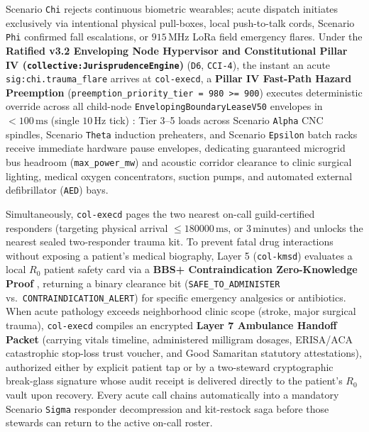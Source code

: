 Scenario \texttt{Chi} rejects continuous biometric wearables; acute dispatch initiates exclusively via intentional physical pull-boxes, local
push-to-talk cords, Scenario \texttt{Phi} confirmed fall escalations, or $915\,\mathrm{MHz}$ LoRa field emergency flares. Under the \textbf{Ratified
v3.2 Enveloping Node Hypervisor and Constitutional Pillar IV (\texttt{collective:JurisprudenceEngine})} (\texttt{D6}, \texttt{CCI-4}), the instant an
acute \texttt{sig:chi.trauma\_flare} arrives at \texttt{col-execd}, a \textbf{Pillar IV Fast-Path Hazard Preemption}
(\texttt{preemption\_priority\_tier = 980 >= 900}) executes deterministic override across all child-node \texttt{EnvelopingBoundaryLeaseV50} envelopes in
$< 100\,\mathrm{ms}$ (single $10\,\mathrm{Hz}$ tick) \parencite{liu1973scheduling}: Tier 3--5 loads across Scenario \texttt{Alpha} CNC spindles,
Scenario \texttt{Theta} induction preheaters, and Scenario \texttt{Epsilon} batch racks receive immediate hardware pause envelopes, dedicating guaranteed
microgrid bus headroom (\texttt{max\_power\_mw}) and acoustic corridor clearance to clinic surgical lighting, medical oxygen concentrators, suction
pumps, and automated external defibrillator (\texttt{AED}) bays.

Simultaneously, \texttt{col-execd} pages the two nearest on-call guild-certified responders (targeting physical arrival $\le 180000\,\mathrm{ms}$, or
$3\,\mathrm{minutes}$) and unlocks the nearest sealed two-responder trauma kit. To prevent fatal drug interactions without exposing a patient's medical
biography, Layer 5 (\texttt{col-kmsd}) evaluates a local $R_0$ patient safety card via a \textbf{BBS+ Contraindication Zero-Knowledge Proof}
\parencite{camenisch2004signature}, returning a binary clearance bit (\texttt{SAFE\_TO\_ADMINISTER} vs.\ \texttt{CONTRAINDICATION\_ALERT}) for specific
emergency analgesics or antibiotics. When acute pathology exceeds neighborhood clinic scope (stroke, major surgical trauma), \texttt{col-execd} compiles
an encrypted \textbf{Layer 7 Ambulance Handoff Packet} (carrying vitals timeline, administered milligram dosages, ERISA/ACA catastrophic stop-loss trust
voucher, and Good Samaritan statutory attestations), authorized either by explicit patient tap or by a two-steward cryptographic break-glass signature
whose audit receipt is delivered directly to the patient's $R_0$ vault upon recovery. Every acute call chains automatically into a mandatory Scenario
\texttt{Sigma} responder decompression and kit-restock saga before those stewards can return to the active on-call roster.

